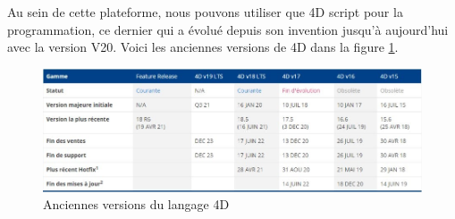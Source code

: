 Au sein de cette plateforme, nous pouvons utiliser que 4D script pour la programmation, 
ce dernier qui a évolué depuis son invention 
jusqu'à aujourd'hui avec la version V20.
Voici les anciennes versions de 4D dans la figure \ref{fig:versions}.
\begin{figure}[h]
    \centering
    \includegraphics[scale=0.6]{Images/versions.jpg} %
    \caption{Anciennes versions du langage 4D\cite{4d}}
    \label{fig:versions}
\end{figure}




